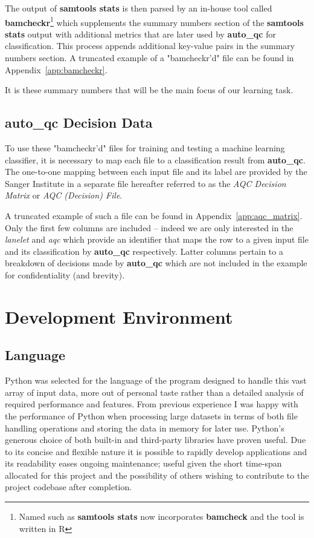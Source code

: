 The output of \textbf{samtools stats} is then parsed by an in-house tool called
\textbf{bamcheckr}\footnote{Named such as \textbf{samtools stats} now incorporates
\textbf{bamcheck} and the tool is written in R} which supplements the summary
numbers section of the \textbf{samtools stats} output with additional metrics
that are later used by \textbf{auto\_qc} for classification.  This process
appends additional key-value pairs in the summary numbers section.  A truncated
example of a "bamcheckr'd" file can be found in Appendix~\ref{app:bamcheckr}.

It is these summary numbers that will be the main focus of our learning task.


\subsection{auto\_qc Decision Data}

To use these "bamcheckr'd" files for training and testing a machine learning
classifier, it is necessary to map each file to a classification result from
\textbf{auto\_qc}. The one-to-one mapping between each input file and its label
are provided by the Sanger Institute in a separate file hereafter referred to as
the \textit{AQC Decision Matrix} or \textit{AQC (Decision) File}.

A truncated example of such a file can be found in Appendix~\ref{app:aqc_matrix}.
Only the first few columns are included -- indeed we are only interested in the
\textit{lanelet} and \textit{aqc} which provide an identifier that maps the row
to a given input file and its classification by \textbf{auto\_qc} respectively.
Latter columns pertain to a breakdown of decisions made by \textbf{auto\_qc}
which are not included in the example for confidentiality (and brevity).


\section{Development Environment}
\subsection{Language}
\label{part1:dev:lang}

Python was selected for the language of the program designed to handle this vast
array of input data, more out of personal taste rather than a detailed analysis
of required performance and features. From previous experience I was happy with
the performance of Python when processing large datasets in terms of both
file handling operations and storing the data in memory for later use. Python's
generous choice of both built-in and third-party libraries have proven useful.
Due to its concise and flexible nature it is possible to rapidly
develop applications and its readability eases ongoing maintenance; useful given
the short time-span allocated for this project and the possibility of others
wishing to contribute to the project codebase after completion.

